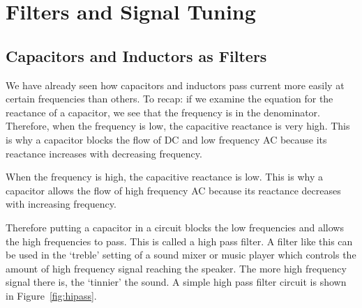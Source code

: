 \section{Filters and Signal Tuning}

\subsection{Capacitors and Inductors as Filters}
We have already seen how capacitors and inductors pass current more easily at certain frequencies than others. To recap: if we examine the equation for the reactance of a capacitor, we see that the frequency is in the denominator. Therefore, when the frequency is low, the capacitive reactance is very high. This is why a capacitor blocks the flow of DC and low frequency AC because its reactance increases with decreasing frequency. 


When the frequency is high, the capacitive reactance is low. This is why a capacitor allows the flow of high frequency AC because its reactance decreases with increasing frequency.


Therefore putting a capacitor in a circuit blocks the low frequencies and allows the high frequencies to pass.  This is called a high pass filter.  A filter like this can be used in the `treble' setting of a sound mixer or music player which controls the amount of high frequency signal reaching the speaker.  The more high frequency signal there is, the `tinnier' the sound.  A simple high pass filter circuit is shown in Figure~\ref{fig:hipass}.

